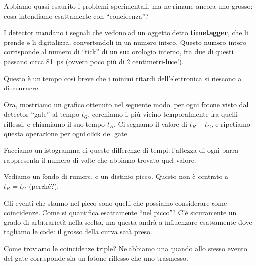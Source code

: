 \documentclass{article}
\begin{document}
Abbiamo quasi esaurito i problemi sperimentali, ma ne rimane ancora uno grosso: cosa intendiamo esattamente con ``concidenza''? 

I detector mandano i segnali che vedono ad un oggetto detto \textbf{timetagger}, che li prende e li digitalizza, convertendoli in un numero intero. Questo numero intero corrisponde al numero di ``tick'' di un suo orologio interno, fra due di questi passano circa \SI{81}{ps} (ovvero poco più di  2 centimetri-luce!).

Questo è un tempo così breve che i minimi ritardi dell'elettronica si riescono a discenrnere. 

Ora, mostriamo un grafico ottenuto nel seguente modo: per ogni fotone visto dal detector ``gate'' al tempo \(t_G\), cerchiamo il più vicino temporalmente fra quelli riflessi, e chiamiamo il suo tempo \(t_R\). 
Ci segnamo il valore di \(t_R - t_G\), e ripetiamo questa operazione per ogni click del gate. 

Facciamo un istogramma di queste differenze di tempi: l'altezza di ogni barra rappresenta il numero di volte che abbiamo trovato quel valore.


Vediamo un fondo di rumore, e un distinto picco. Questo non è centrato a \(t_R = t_G\) (perché?). 

Gli eventi che stanno nel picco sono quelli che possiamo considerare come coincidenze. 
Come si quantifica esattamente ``nel picco''? C'è sicuramente un grado di arbitrarietà nella scelta, ma questa andrà a influenzare esattamente dove tagliamo le code: il grosso della curva sarà preso.

Come troviamo le coincidenze triple? Ne abbiamo una quando allo stesso evento del gate corrisponde sia un fotone riflesso che uno trasmesso.

\printbibliography
\end{document}
